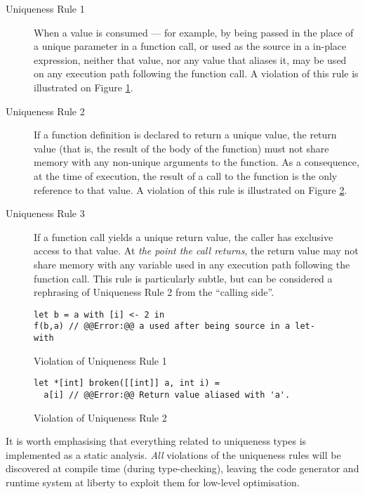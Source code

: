 \documentclass[oneside,11pt]{book}
\begin{document}
\begin{description}
\item[Uniqueness Rule 1] When a value is consumed --- for example, by
  being passed in the place of a unique parameter in a function call,
  or used as the source in a in-place  expression, neither
  that value, nor any value that aliases it, may be used on any
  execution path following the function call.  A violation of this
  rule is illustrated on Figure \ref{fig:uniqueness-rule-1-violation}.

\item[Uniqueness Rule 2] If a function definition is declared to
  return a unique value, the return value (that is, the result of the
  body of the function) must not share memory with any non-unique
  arguments to the function.  As a consequence, at the time of
  execution, the result of a call to the function is the only
  reference to that value.  A violation of this rule is illustrated on
  Figure \ref{fig:uniqueness-rule-2-violation}.

\item[Uniqueness Rule 3] If a function call yields a unique return
  value, the caller has exclusive access to that value.  At
  \textit{the point the call returns}, the return value may not share
  memory with any variable used in any execution path following the
  function call.  This rule is particularly subtle, but can be
  considered a rephrasing of Uniqueness Rule 2 from the ``calling
  side''.
\end{description}

\begin{figure}
\centering
\begin{lstlisting}
let b = a with [i] <- 2 in
f(b,a) // @@Error:@@ a used after being source in a let-with
\end{lstlisting}
\caption{Violation of Uniqueness Rule 1}
\label{fig:uniqueness-rule-1-violation}
\end{figure}

\begin{figure}
\centering
\begin{lstlisting}
let *[int] broken([[int]] a, int i) =
  a[i] // @@Error:@@ Return value aliased with 'a'.
\end{lstlisting}
\caption{Violation of Uniqueness Rule 2}
\label{fig:uniqueness-rule-2-violation}
\end{figure}

It is worth emphasising that everything related to uniqueness types is
implemented as a static analysis.  \textit{All} violations of the
uniqueness rules will be discovered at compile time (during
type-checking), leaving the code generator and runtime system at
liberty to exploit them for low-level optimisation.
\end{document}
